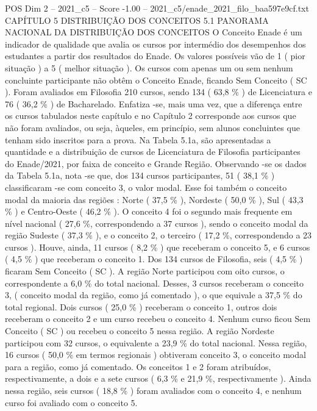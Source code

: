 \begin{textsample}{POS Dim 2 – 2021\_c5 – Score -1.00 – 2021\_c5/enade\_2021\_filo\_baa597e9cf.txt}  \label{ex:f2_pos_294}
CAPÍTULO 5 DISTRIBUIÇÃO DOS CONCEITOS 5.1 PANORAMA NACIONAL DA DISTRIBUIÇÃO DOS CONCEITOS O Conceito Enade é um indicador de qualidade que avalia os cursos por intermédio dos desempenhos dos estudantes a partir dos resultados do Enade.
Os valores possíveis vão de 1 ( pior situação ) a 5 ( melhor situação ).
Os cursos com apenas um ou sem nenhum concluinte participante não obtêm o Conceito Enade, ficando Sem Conceito ( SC ).
Foram avaliados em Filosofia 210 cursos, sendo 134 ( 63,8 \% ) de Licenciatura e 76 ( 36,2 \% ) de Bacharelado.
Enfatiza -se, mais uma vez, que a diferença entre os cursos tabulados neste capítulo e no Capítulo 2 corresponde aos cursos que não foram avaliados, ou seja, àqueles, em princípio, sem alunos concluintes que tenham sido inscritos para a prova.
Na Tabela 5.1a, são apresentadas a quantidade e a distribuição de cursos de Licenciatura de Filosofia participantes do Enade/2021, por faixa de conceito e Grande Região.
Observando -se os dados da Tabela 5.1a, nota -se que, dos 134 cursos participantes, 51 ( 38,1 \% ) classificaram -se com conceito 3, o valor modal.
Esse foi também o conceito modal da maioria das regiões : Norte ( 37,5 \% ), Nordeste ( 50,0 \% ), Sul ( 43,3 \% ) e Centro-Oeste ( 46,2 \% ).
O conceito 4 foi o segundo mais frequente em nível nacional ( 27,6 \%, correspondendo a 37 cursos ), sendo o conceito modal da região Sudeste ( 37,3 \% ), e o conceito 2, o terceiro ( 17,2 \%, correspondendo a 23 cursos ).
Houve, ainda, 11 cursos ( 8,2 \% ) que receberam o conceito 5, e 6 cursos ( 4,5 \% ) que receberam o conceito 1.
Dos 134 cursos de Filosofia, seis ( 4,5 \% ) ficaram Sem Conceito ( SC ).
A região Norte participou com oito cursos, o correspondente a 6,0 \% do total nacional.
Desses, 3 cursos receberam o conceito 3, ( conceito modal da região, como já comentado ), o que equivale a 37,5 \% do total regional.
Dois cursos ( 25,0 \% ) receberam o conceito 1, outros dois receberam o conceito 2 e um curso recebeu o conceito 4.
Nenhum curso ficou Sem Conceito ( SC ) ou recebeu o conceito 5 nessa região.
A região Nordeste participou com 32 cursos, o equivalente a 23,9 \% do total nacional.
Nessa região, 16 cursos ( 50,0 \% em termos regionais ) obtiveram conceito 3, o conceito modal para a região, como já comentado.
Os conceitos 1 e 2 foram atribuídos, respectivamente, a dois e a sete cursos ( 6,3 \% e 21,9 \%, respectivamente ).
Ainda nessa região, seis cursos ( 18,8 \% ) foram avaliados com o conceito 4, e nenhum curso foi avaliado com o conceito 5.

\end{textsample}
